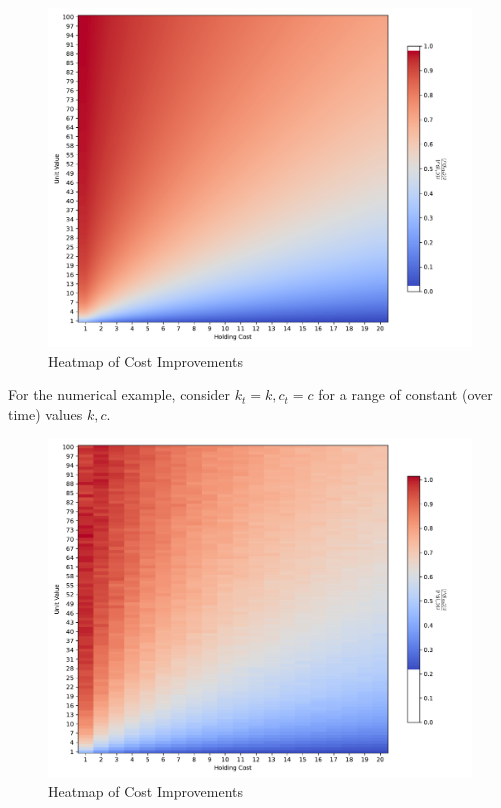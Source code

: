 \documentclass[a4paper,12pt]{article}
\theoremstyle{definition}
\begin{document}
	
	
	\begin{figure}[h!]
		\centering
		\includegraphics[width=\textwidth]{figures/analytical_heatmap.pdf}
		\caption{Heatmap of Cost Improvements}
		\label{fig:heatmap_analytical}
	\end{figure}
	
	
	
	For the numerical example, consider $k_t=k,c_t=c$ for a range of constant (over time) values $k,c$.
	
	\begin{figure}[h!]
		\centering
		\includegraphics[width=\textwidth]{figures/numerical_heatmap.pdf}
		\caption{Heatmap of Cost Improvements}
		\label{fig:heatmap}
	\end{figure}
	
\end{document}
